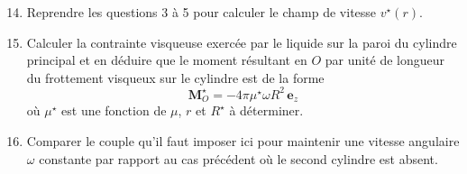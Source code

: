 \begin{enumerate}
\setcounter{enumi}{13}
\item
Reprendre les questions 3 \`a 5 pour calculer le champ de vitesse $v^\star(r)$.
\item
Calculer la contrainte visqueuse exerc\'ee par le liquide sur la paroi du
cylindre principal et en d\'eduire que le moment r\'esultant en $O$ par unit\'e
de longueur du frottement visqueux sur le cylindre est de la forme
\[
\mathbf{M}_O^\star = -4\pi \mu^\star \omega R^2 \, \mathbf{e}_z
\]
o\`u $\mu^\star$ est une fonction de $\mu$, $r$ et $R^\star$ \`a d\'eterminer. 
\item
Comparer le couple qu'il faut imposer ici pour maintenir une vitesse angulaire
$\omega$ constante par rapport au cas pr\'ec\'edent o\`u le second cylindre
est absent.
\end{enumerate}




